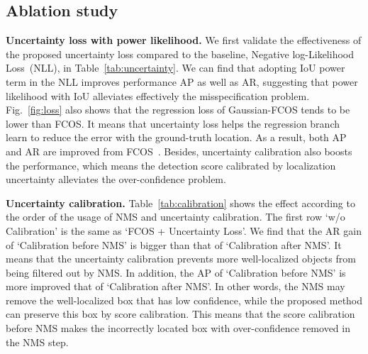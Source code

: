 \documentclass[final]{cvpr}
\begin{document}
\subsection{Ablation study}
\noindent
\textbf{Uncertainty loss with power likelihood.}
We first validate the effectiveness of the proposed uncertainty loss compared to the baseline, Negative log-Likelihood Loss~(NLL), in Table~\ref{tab:uncertainty}.
We can find that adopting IoU power term in the NLL improves performance AP as well as AR, suggesting that power likelihood with IoU alleviates effectively the misspecification problem. 
Fig.~\ref{fig:loss} also shows that the regression loss of Gaussian-FCOS tends to be lower than FCOS.
It means that uncertainty loss helps the regression branch learn to reduce the error with the ground-truth location.
As a result, both AP and AR are improved from FCOS~\cite{Tian_2019_ICCV}.
Besides, uncertainty calibration also boosts the performance, which means the detection score calibrated by localization uncertainty alleviates the over-confidence problem.


\medskip

\noindent
\textbf{Uncertainty calibration.}
Table~\ref{tab:calibration} shows the effect according to the order of the usage of NMS and uncertainty calibration.
The first row `w/o Calibration' is the same as `FCOS + Uncertainty Loss'.
We find that the AR gain of `Calibration before NMS' is bigger than that of `Calibration after NMS'. 
It means that the uncertainty calibration prevents more well-localized objects from being filtered out by NMS.
In addition, the AP of `Calibration before NMS' is more improved that of `Calibration after NMS'.
In other words, the NMS may remove the well-localized box that has low confidence, while the proposed method can preserve this box by score calibration.
This means that the score calibration before NMS makes the incorrectly located box with over-confidence removed in the NMS step.





\begin{table}
  \centering
  \caption{\textbf{Uncertainty calibration with NMS.} Calibrating the detection score before NMS prevents well-localized boxes from being filtered out while inaccurately located boxes with over-confidence are removed in NMS step.}
  \label{tab:calibration}
\end{table}
\end{document}
